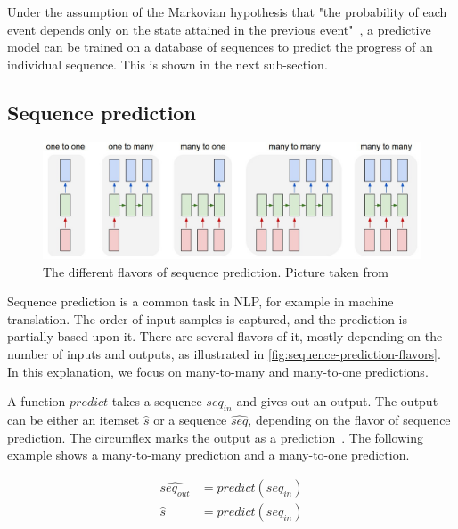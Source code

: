 Under the assumption of the Markovian hypothesis that "the probability of each event depends only on the state attained in the previous event"~\cite{gagniuc2017markov}, a predictive model can be trained on a database of sequences to predict the progress of an individual sequence. This is shown in the next sub-section.

\subsection{Sequence prediction}\label{sec:background:sequence-prediction}
\begin{figure}[!htb]
    \centering
    \includegraphics[width=.75\textwidth]{gfx/sequence-prediction-flavors.jpeg}
    \caption[Flavors of sequence prediction]{The different flavors of sequence prediction. Picture taken from~\cite{web:lstm-effectiveness}}
    \label{fig:sequence-prediction-flavors}
\end{figure}

Sequence prediction is a common task in NLP, for example in machine translation. The order of input samples is captured, and the prediction is partially based upon it. There are several flavors of it, mostly depending on the number of inputs and outputs, as illustrated in \autoref{fig:sequence-prediction-flavors}. In this explanation, we focus on many-to-many and many-to-one predictions.

A function $predict$ takes a sequence $seq_{in}$ and gives out an output. The output can be either an itemset $\hat{s}$ or a sequence $\widehat{seq}$, depending on the flavor of sequence prediction. The circumflex marks the output as a prediction~\cite{kuhn2013applied}. The following example shows a many-to-many prediction and a many-to-one prediction.

\begin{equation}
\begin{split}
    \widehat{seq_{out}} &= predict(seq_{in})\\
    \hat{s}             &= predict(seq_{in})
\end{split}
\label{eq:prediction-from-sequence}
\end{equation}

